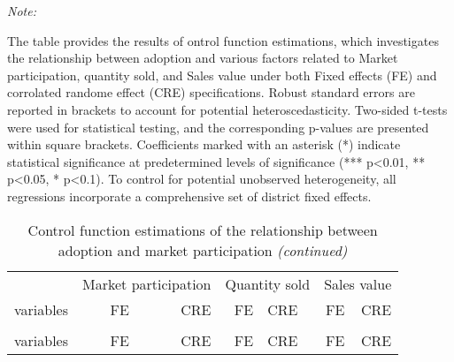 \documentclass[
]{article}
\begin{document}
\begin{ThreePartTable}
\begin{TableNotes}[para]
\item \textit{Note: } 
\item The table provides the results of ontrol function estimations, which investigates the relationship between adoption and various factors related to Market participation, quantity sold, and Sales value under both Fixed effects (FE) and corrolated randome effect (CRE) specifications. Robust standard errors are reported in brackets to account for potential heteroscedasticity. Two-sided t-tests were used for statistical testing, and the corresponding p-values are presented within square brackets. Coefficients marked with an asterisk (*) indicate statistical significance at predetermined levels of significance (*** p<0.01, ** p<0.05, * p<0.1). To control for potential unobserved heterogeneity, all regressions incorporate a comprehensive set of district fixed effects.
\end{TableNotes}
\begin{longtable}[t]{lrrrlrr}
\caption{\label{tab:unnamed-chunk-2}Control function estimations of the relationship between adoption and market participation}\\
\toprule
\multicolumn{1}{c}{ } & \multicolumn{2}{c}{Market participation} & \multicolumn{2}{c}{Quantity sold} & \multicolumn{2}{c}{Sales value} \\
\cmidrule(l{3pt}r{3pt}){2-3} \cmidrule(l{3pt}r{3pt}){4-5} \cmidrule(l{3pt}r{3pt}){6-7}
variables & FE & CRE & FE & CRE & FE & CRE\\
\midrule
\endfirsthead
\caption[]{\label{tab:unnamed-chunk-2}Control function estimations of the relationship between adoption and market participation \textit{(continued)}}\\
\toprule
variables & FE & CRE & FE & CRE & FE & CRE\\
\midrule
\endhead


\end{longtable}
\end{ThreePartTable}
\end{document}

